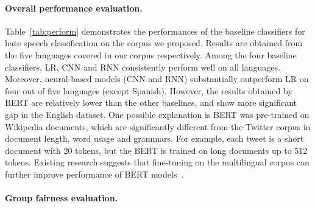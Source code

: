\paragraph{Overall performance evaluation.}
Table~\ref{tab:perform} demonstrates the performances of the baseline classifiers for hate speech classification on the corpus we proposed. 
Results are obtained from the five languages covered in our corpus respectively.
Among the four baseline classifiers, LR, CNN and RNN consistently perform well on all languages.
Moreover, neural-based models (CNN and RNN) substantially outperform LR on four out of five languages (except Spanish).
However, the results obtained by BERT are relatively lower than the other baselines, and show more significant gap in the English dataset.
One possible explanation is BERT was pre-trained on Wikipedia documents, which are significantly different from the Twitter corpus in document length, word usage and grammars.
For example, each tweet is a short document with 20 tokens, but the BERT is trained on long documents up to 512 tokens.
Existing research suggests that fine-tuning on the multilingual corpus can further improve performance of BERT models~\cite{sun2019fine}.



\paragraph{Group fairness evaluation.}

